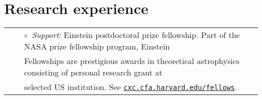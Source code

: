 \documentclass[11pt,letterpaper,sans]{moderncv}
\begin{document}

\section{Research experience}

\vspace{-0.1cm}
\begin{tabular}{rcl}
&\hspace{0.4cm} &$\circ\;\;${\textit{Support}}: Einstein postdoctoral prize fellowship.  Part of the NASA prize fellowship program, Einstein\\
&\hspace{0.4cm} &  \hspace{0.4cm}Fellowships are prestigious awards in theoretical astrophysics consisting of personal research grant at\\
&\hspace{0.4cm} &  \hspace{0.4cm}selected US institution. See  \href{http://cxc.cfa.harvard.edu/fellows}{\texttt{cxc.cfa.harvard.edu/fellows}}.\\
\end{tabular}
\vspace{0.3cm}
\end{document}

